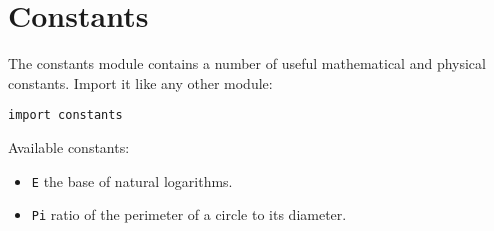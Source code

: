 \hypertarget{constants}{%
\section{Constants}\label{constants}}

The constants module contains a number of useful mathematical and
physical constants. Import it like any other module:

\begin{lstlisting}
import constants
\end{lstlisting}

Available constants:

\begin{itemize}

\item
  \texttt{E} the base of natural logarithms.
\item
  \texttt{Pi} ratio of the perimeter of a circle to its diameter.
\end{itemize}
